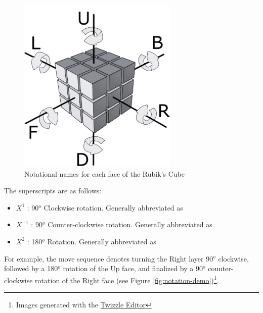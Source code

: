 \begin{figure}[h]
    \centering
    \caption[Rubik's Cube Notation]{Notational names for each face of the Rubik's Cube \cite{img-cube-notation}}
    \label{fig:cube-notation}
    \includegraphics{Figures/2 Background/rubik's_cube_notation_bw.png}
\end{figure}

\newpage
The superscripts are as follows:

\begin{itemize}
    \item $X^1$ : 90$^o$ Clockwise rotation. Generally abbreviated as 
    \item $X^{-1}$ : 90$^o$ Counter-clockwise rotation. Generally abbreviated as 
    \item $X^2$ : 180$^o$ Rotation. Generally abbreviated as 
\end{itemize}

For example, the move sequence  denotes turning the Right
layer 90$^o$ clockwise, followed by a 180$^o$ rotation of the Up face,
and finalized by a 90$^o$ counter-clockwise rotation of the Right face
(see Figure \ref{fig:notation-demo})\footnote{Images generated with the
\href{https://alpha.twizzle.net/edit/?alg=R+U2+R\%27}{Twizzle Editor}}.

